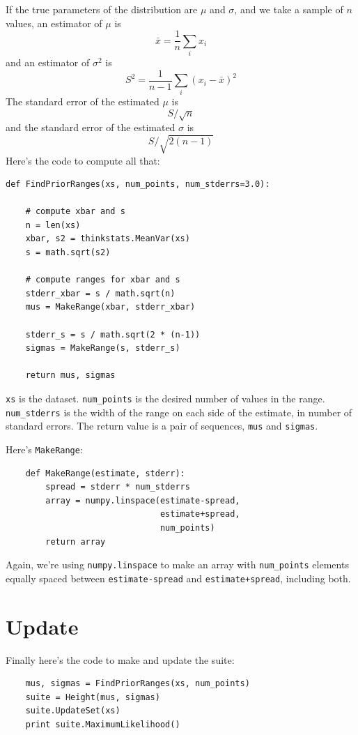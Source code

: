\documentclass[12pt]{book}
\begin{document}
If the true parameters of the distribution are $\mu$ and
$\sigma$, and we take a sample of $n$ values, an estimator
of $\mu$ is
%
\[ \bar{x} = \frac{1}{n} \sum_i x_i \]
%
and an estimator of $\sigma^2$ is
%
\[ S^2 = \frac{1}{n-1} \sum_i (x_i - \bar{x})^2 \]
%
The standard error of the estimated $\mu$ is
%
\[ S / \sqrt{n} \]
%
and the standard error of the estimated $\sigma$ is
%
\[ S / \sqrt{2 (n-1)}\]
%
Here's the code to compute all that:

\begin{verbatim}
def FindPriorRanges(xs, num_points, num_stderrs=3.0):

    # compute xbar and s
    n = len(xs)
    xbar, s2 = thinkstats.MeanVar(xs)
    s = math.sqrt(s2)

    # compute ranges for xbar and s
    stderr_xbar = s / math.sqrt(n)
    mus = MakeRange(xbar, stderr_xbar)

    stderr_s = s / math.sqrt(2 * (n-1))
    sigmas = MakeRange(s, stderr_s)

    return mus, sigmas
\end{verbatim}

{\tt xs} is the dataset.  \verb"num_points" is the desired number of
values in the range.  \verb"num_stderrs" is the width of the range on
each side of the estimate, in number of standard errors.  The return
value is a pair of sequences, {\tt mus} and {\tt sigmas}.

Here's {\tt MakeRange}:

\begin{verbatim}
    def MakeRange(estimate, stderr):
        spread = stderr * num_stderrs
        array = numpy.linspace(estimate-spread,
                               estimate+spread,
                               num_points)
        return array
\end{verbatim}

Again, we're using {\tt numpy.linspace} to make an array with
\verb"num_points" elements equally spaced between
{\tt estimate-spread} and {\tt estimate+spread}, including
both.


\section{Update}

Finally here's the code to make and update the suite:

\begin{verbatim}
    mus, sigmas = FindPriorRanges(xs, num_points)
    suite = Height(mus, sigmas)
    suite.UpdateSet(xs)
    print suite.MaximumLikelihood()    
\end{verbatim}
\end{document}
